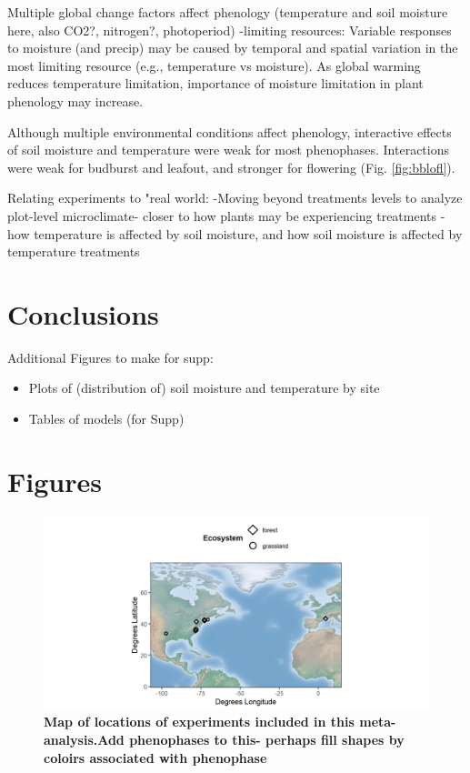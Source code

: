\documentclass{article}
\begin{document}
\par Multiple global change factors affect phenology (temperature and soil moisture here, also CO2?, nitrogen?, photoperiod)
 -limiting resources: Variable responses to moisture (and precip) may be caused by temporal and spatial variation in the most limiting resource (e.g., temperature vs moisture). As global warming reduces temperature limitation, importance of moisture limitation in plant phenology may increase. 

\par Although multiple environmental conditions affect phenology, interactive effects of soil moisture and temperature were weak for most phenophases. Interactions were weak for budburst and leafout, and stronger for flowering (Fig. \ref{fig:bblofl}).

\par Relating experiments to "real world:
  -Moving beyond treatments levels to analyze plot-level microclimate- closer to how plants may be experiencing treatments
  -how temperature is affected by soil moisture, and how soil moisture is affected by temperature treatments


\section* {Conclusions}

\par Additional Figures to make for supp:
 \begin{itemize}
 \item Plots of (distribution of) soil moisture and temperature by site
\item Tables of models (for Supp)
\end{itemize}



\section*{Figures}

\begin{figure}[h]
\centering
 \includegraphics{../../Analyses/maps/soilms_experiments_map.png}
 \caption{\textbf{Map of locations of experiments included in this meta-analysis.Add phenophases to this- perhaps fill shapes by coloirs associated with phenophase}} 
 \label{fig:map}
 \end{figure}
 
\end{document}
